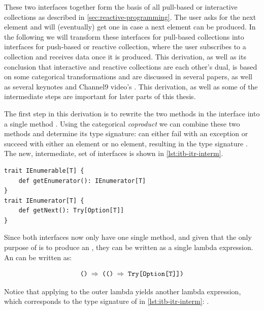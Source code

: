 These two interfaces together form the basis of all pull-based or interactive collections as described in \autoref{sec:reactive-programming}. The user asks for the next element and will (eventually) get one in case a next element can be produced. In the following we will transform these interfaces for pull-based collections into interfaces for push-based or reactive collection, where the user subscribes to a collection and receives data once it is produced. This derivation, as well as its conclusion that interactive and reactive collections are each other's dual, is based on some categorical transformations and are discussed in several papers, as well as several keynotes and Channel9 video's \cite{meijer2010-Observable, meijer2012-YMIAD, E2E-Rx, meijer2014-Duality-And-The-End-Of-Reactive}. This derivation, as well as some of the intermediate steps are important for later parts of this thesis.

The first step in this derivation is to rewrite the two methods in the \ier interface into a single method . Using the categorical \textit{coproduct} \cite{rydeheard1988-Category-Theory} we can combine these two methods and determine its type signature:  can either fail with an exception or succeed with either an element or no element, resulting in the type signature . The new, intermediate, set of interfaces is shown in \autoref{lst:itb-itr-interm}.

\begin{minipage}{\linewidth}
\begin{lstlisting}[style=ScalaStyle, caption={\ier interface after applying coproduct}, label={lst:itb-itr-interm}]
trait IEnumerable[T] {
    def getEnumerator(): IEnumerator[T]
}
trait IEnumerator[T] {
    def getNext(): Try[Option[T]]
}
\end{lstlisting}
\end{minipage}

Since both interfaces now only have one single method, and given that the only purpose of \ieb is to produce an \ier, they can be written as a single lambda expression. An \ieb can be written as:

\begin{equation} \label{eq:itb}
\code{() $\Rightarrow$ (() $\Rightarrow$ Try[Option[T]])}
\end{equation}

Notice that applying  to the outer lambda yields another lambda expression, which corresponds to the type signature of  in \autoref{lst:itb-itr-interm}: .

